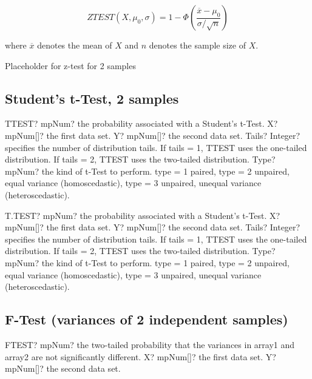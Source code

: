 \begin{equation}
	ZTEST(X, \mu_0, \sigma) = 1 - \Phi \left(\frac{\overline{x} - \mu_0}{\sigma / \sqrt{n}} \right)
\end{equation}

where $\overline{x}$ denotes the mean of $X$ and $n$ denotes the sample size of $X$.


Placeholder for z-test for 2 samples
\label{2IndependentSamplesZTest}


\subsection{Student's t-Test, 2 samples}
\label{TTest2}
\begin{mpFunctionsExtract}
	\mpWorksheetFunctionFourNotImplemented
	{TTEST? mpNum? the probability associated with a Student's t-Test.}
	{X? mpNum[]? the first data set.}
	{Y? mpNum[]? the second data set.}
	{Tails? Integer?  specifies the number of distribution tails. If tails = 1, TTEST uses the one-tailed distribution. If tails = 2, TTEST uses the two-tailed distribution.}
	{Type? mpNum? the kind of t-Test to perform. type = 1 paired, type = 2 unpaired, equal variance (homoscedastic), type = 3 unpaired, unequal variance (heteroscedastic).}
\end{mpFunctionsExtract}



\vspace{0.6cm}
\begin{mpFunctionsExtract}
	\mpWorksheetFunctionFourNotImplemented
	{T.TEST? mpNum? the probability associated with a Student's t-Test.}
	{X? mpNum[]? the first data set.}
	{Y? mpNum[]? the second data set.}
	{Tails? Integer?  specifies the number of distribution tails. If tails = 1, TTEST uses the one-tailed distribution. If tails = 2, TTEST uses the two-tailed distribution.}
	{Type? mpNum? the kind of t-Test to perform. type = 1 paired, type = 2 unpaired, equal variance (homoscedastic), type = 3 unpaired, unequal variance (heteroscedastic).}
\end{mpFunctionsExtract}




\subsection{F-Test (variances of 2 independent samples)}
\label{FTestVariances}
\begin{mpFunctionsExtract}
	\mpWorksheetFunctionTwoNotImplemented
	{FTEST? mpNum? the two-tailed probability that the variances in array1 and array2 are not significantly different.}
	{X? mpNum[]? the first data set.}
	{Y? mpNum[]? the second data set.}
\end{mpFunctionsExtract}

